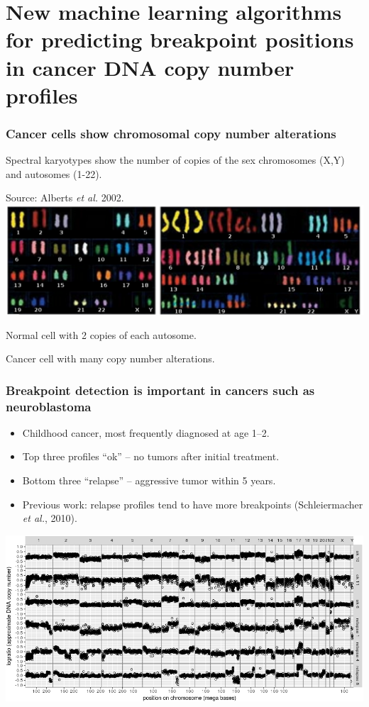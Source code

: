 \documentclass{beamer}
\begin{document}
\section{New machine learning algorithms for predicting breakpoint positions in cancer DNA copy number profiles}

\begin{frame}
  \frametitle{Cancer cells show chromosomal copy number alterations}
  Spectral karyotypes show the number of copies of the sex chromosomes
  (X,Y) and autosomes (1-22). 

  Source: Alberts \emph{et al.} 2002.
\vskip 0.1in
  \includegraphics[width=\textwidth]{Karyo-both}
\vskip 0.1in
  \begin{minipage}{0.4\linewidth}
    Normal cell with 2 copies of each autosome.
  \end{minipage}
\linewidth
  \begin{minipage}{0.4\linewidth}
Cancer cell with many copy number alterations.
  \end{minipage}
\end{frame}

\begin{frame}
  \frametitle{Breakpoint detection is important in cancers such as
    neuroblastoma } 

  \begin{itemize}
  \item Childhood cancer, most frequently diagnosed at age 1--2.
  \item Top three profiles ``ok'' -- no tumors after initial treatment.
  \item Bottom three ``relapse'' -- aggressive tumor within 5 years.
  \item Previous work: relapse profiles tend to have more breakpoints
     (Schleiermacher {\it et al.}, 2010).
  \end{itemize}

  \includegraphics[width=\textwidth]{neuroblastoma-ok-relapse}
\end{frame}
\end{document}
